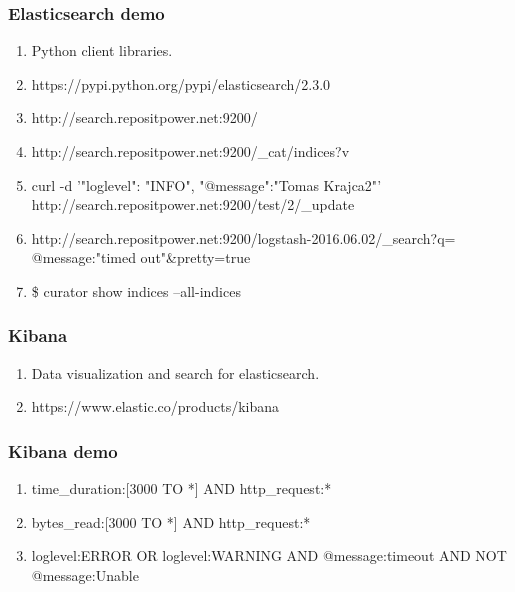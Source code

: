 \documentclass[13pt, ignorenonframetext]{beamer}
\begin{document}
\begin{frame}
\frametitle{Elasticsearch demo}
\begin{enumerate}
\item Python client libraries. 
\item https://pypi.python.org/pypi/elasticsearch/2.3.0
\item http://search.repositpower.net:9200/
\item http://search.repositpower.net:9200/\_cat/indices?v
\item curl -d '{"loglevel": "INFO", "@message":"Tomas Krajca2"}' http://search.repositpower.net:9200/test/2/\_update
\item http://search.repositpower.net:9200/logstash-2016.06.02/\_search?q=
      @message:"timed out"\&pretty=true
\item \$ curator show indices --all-indices
\end{enumerate}
\end{frame}

\begin{frame}
\frametitle{Kibana}
\begin{enumerate}
\item Data visualization and search for elasticsearch.
\item https://www.elastic.co/products/kibana
\end{enumerate}
\end{frame}


\begin{frame}
\frametitle{Kibana demo}
\begin{enumerate}
\item time\_duration:[3000 TO *] AND http\_request:*
\item bytes\_read:[3000 TO *] AND http\_request:*
\item loglevel:ERROR OR loglevel:WARNING AND @message:timeout AND NOT @message:Unable
\end{enumerate}
\end{frame}
\end{document}
